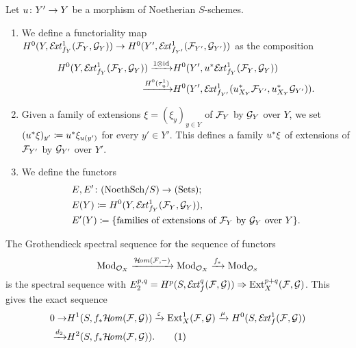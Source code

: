 \begin{definition} 
	Let $u\colon Y'\to Y$ be a morphism of Noetherian $S$-schemes.

	\begin{enumerate}\item We define a functoriality map
	$H^0(Y,\mathcal{E}\!\mathit{xt}^1_{f_Y}(\mathcal{F}_Y,\mathcal{G}_Y))
	\to
	H^0(Y',\mathcal{E}\!\mathit{xt}^1_{f_{Y'}}(\mathcal{F}_{Y'},\mathcal{G}_{Y'}))
	$
	as the composition
	\begin{align*}
		H^0(Y,\mathcal{E}\!\mathit{xt}^1_{f_Y}(\mathcal{F}_Y,\mathcal{G}_Y))
		\xrightarrow{1\otimes \operatorname{id}} & 
		H^0(Y',u^{*}\mathcal{E}\!\mathit{xt}^1_{f_Y}(\mathcal{F}_Y,\mathcal{G}_Y)) \\
		\xrightarrow{H^0(\tau^1_u)} &
		H^0(Y',\mathcal{E}\!\mathit{xt}^1_{f_{Y'}}(u_{X_Y}^{*}\mathcal{F}_{Y'},u_{X_Y}^{*}\mathcal{G}_{Y'})).
	\end{align*}

	\item Given a family of extensions $\xi = (\xi_y)_{y\in Y}$ of $\mathcal{F}_Y$ by $\mathcal{G}_Y$ over $Y$, we set $(u^{*}\xi)_{y'} \coloneqq u^{*}\xi_{u(y')}$ for every $y' \in Y'$. This defines a family $u^{*}\xi$ of extensions of $\mathcal{F}_{Y'}$ by $\mathcal{G}_{Y'}$ over $Y'$.

	\item We define the functors
	\begin{align*}
		& E,E' \colon (\textup{NoethSch}/S) \to (\textup{Sets}); \\
		& E(Y) \coloneqq H^0(Y,\mathcal{E}\!\mathit{xt}^1_{f_Y}(\mathcal{F}_Y,\mathcal{G}_Y)), \\
		& E'(Y) \coloneqq \{\text{families of extensions of $\mathcal{F}_Y$ by $\mathcal{G}_Y$ over } Y\}.
	\end{align*}
\end{enumerate}
\end{definition}
\begin{remark}
	The Grothendieck spectral sequence for the sequence of functors
	\[\mathrm{Mod}_{\mathcal{O}_X}\xrightarrow{\mathcal{H}\!\mathit{om}(\mathcal{F},-)} \mathrm{Mod}_{\mathcal{O}_X}\xrightarrow{f_{*}} \mathrm{Mod}_{\mathcal{O}_S}\]
	is the spectral sequence with $E_2^{p,q}=H^p(S,\mathcal{E}\!\mathit{xt}^q_f(\mathcal{F},\mathcal{G})) \Rightarrow \operatorname{Ext}^{p+q}_X(\mathcal{F},\mathcal{G})$. This gives the exact sequence
	\begin{align*}
		0
		 \to & H^1(S,\pushf{f}\HOM(\mc{F},\mc{G}))
		 \xto{\varepsilon} \Ext^1_X(\mc{F},\mc{G})
		 \xto{\mu} H^0(S,\EXT^1_f(\mc{F},\mc{G})) \\
		 \xto{d_2} & H^2(S,\pushf{f}\HOM(\mc{F},\mc{G})). \label{es-rel-ext} \addtocounter{equation}{1}\tag{\theequation}
	\end{align*}
\end{remark}

